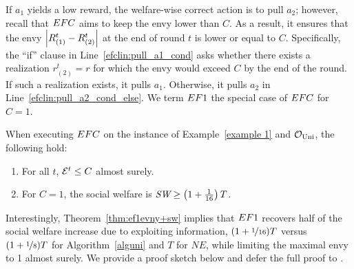If $a_1$ yields a low reward, the welfare-wise correct action is to pull $a_2$; however, recall that $EFC$ aims to keep the envy lower than $C$. As a result, it ensures that the envy $\left\lvert R^t_{(1)}-R^t_{(2)}\right\rvert$ at the end of round $t$ is lower or equal to $C$. Specifically, the ``if'' clause in Line~\ref{efclin:pull_a1_cond} asks whether there exists a realization $r^t_{(2)}=r$ for which the envy would exceed $C$ by the end of the round. If such a realization exists, it pulls $a_1$. Otherwise, it pulls $a_2$ in Line~\ref{efclin:pull_a2_cond_else}. We term $EF1$ the special case of $EFC$ for $C=1$. 
\begin{theorem}\label{thm:ef1evny+sw}
When executing $EFC$ on the instance of Example~\ref{example 1} and $\mathcal O_{\textnormal{Uni}}$, the following hold:
\begin{enumerate}
    \item For all $t$, $\mathcal{E}^t \leq C$ almost surely.
    \item For $C=1$, the social welfare is $\textit{SW} \geq \left(1 + \frac{1}{16}\right)T$.
\end{enumerate}
\end{theorem}
Interestingly, Theorem~\ref{thm:ef1evny+sw} implies that $EF1$ recovers half of the social welfare increase due to exploiting information, $(1+\nicefrac{1}{16})T$ versus $(1+\nicefrac{1}{8})T$ for Algorithm~\ref{alguni} and $T$ for $NE$, while limiting the maximal envy to 1 almost surely. We provide a proof sketch below and defer the full proof to .
